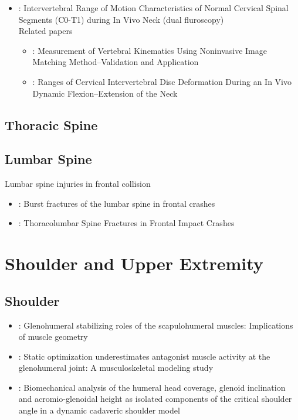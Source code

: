 \documentclass[]{book}
\providecommand{\tightlist}{%
  \setlength{\itemsep}{0pt}\setlength{\parskip}{0pt}}
\begin{document}
\begin{itemize}
\tightlist
\item
  \citet{Zhou2019} : Intervertebral Range of Motion Characteristics of Normal Cervical Spinal Segments (C0-T1) during In Vivo Neck (dual fluroscopy)\\
  Related papers

  \begin{itemize}
  \tightlist
  \item
    \citet{Wang2008}: Measurement of Vertebral Kinematics Using Noninvasive Image Matching Method--Validation and Application
  \item
    \citet{Yu2017}: Ranges of Cervical Intervertebral Disc Deformation During an In Vivo Dynamic Flexion--Extension of the Neck
  \end{itemize}
\end{itemize}

\hypertarget{thoracic-spine}{%
\section{Thoracic Spine}\label{thoracic-spine}}

\hypertarget{lumbar-spine}{%
\section{Lumbar Spine}\label{lumbar-spine}}

Lumbar spine injuries in frontal collision

\begin{itemize}
\item
  \citet{Kaufman2013}: Burst fractures of the lumbar spine in frontal crashes
\item
  \citet{Pintar2012}: Thoracolumbar Spine Fractures in Frontal Impact Crashes
\end{itemize}

\hypertarget{shoulder-and-upper-extremity}{%
\chapter{Shoulder and Upper Extremity}\label{shoulder-and-upper-extremity}}

\hypertarget{shoulder}{%
\section{Shoulder}\label{shoulder}}

\begin{itemize}
\item
  \citet{Mulla2019}: Glenohumeral stabilizing roles of the scapulohumeral muscles: Implications of muscle geometry
\item
  \citet{Kian2019}: Static optimization underestimates antagonist muscle activity at the glenohumeral joint: A musculoskeletal modeling study
\item
  \citet{Bouaicha2019}: Biomechanical analysis of the humeral head coverage, glenoid inclination and acromio-glenoidal height as isolated components of the critical shoulder angle in a dynamic cadaveric shoulder model
\end{itemize}
\end{document}
